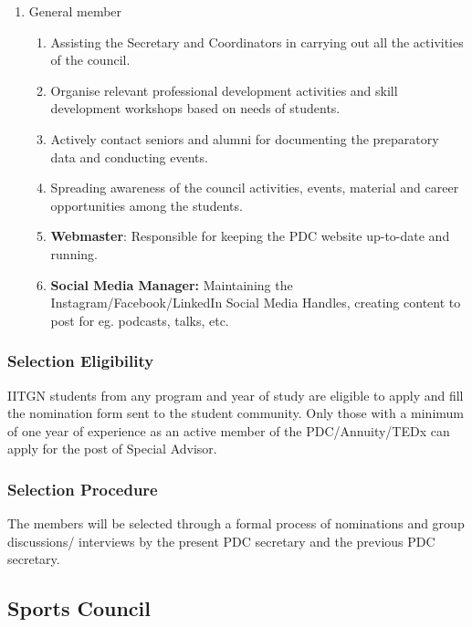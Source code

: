 \documentclass[12pt]{article}
\begin{document}
\begin{enumerate}
\begin{enumerate}
        \item Acting as a bridge between the PDC and the student body, the Special Advisor will communicate important information and gather feedback to ensure effective collaboration.
    \end{enumerate}
    \item General member
    \begin{enumerate}
        \item Assisting the Secretary and Coordinators in carrying out all the activities of the council.
        \item Organise relevant professional development activities and skill development workshops based on needs of students.
        \item Actively contact seniors and alumni for documenting the preparatory data and conducting events.
        \item Spreading awareness of the council activities, events, material and career opportunities among the students.
        \item \textbf{Webmaster}: Responsible for keeping the PDC  website up-to-date and running. 
        \item \textbf{Social Media Manager:} Maintaining the Instagram/Facebook/LinkedIn Social Media Handles, creating content to post for eg. podcasts, talks, etc.
    \end{enumerate}
\end{enumerate}

\subsubsection{Selection Eligibility}
IITGN students from any program and year of study are eligible to apply and fill the nomination form sent to the student community. Only those with a minimum of one year of experience as an active member of the PDC/Annuity/TEDx can apply for the post of Special Advisor.

\subsubsection{Selection Procedure}
The members will be selected through a formal process of nominations
and group discussions/ interviews by the present PDC secretary and the previous PDC secretary.


\newpage
\subsection{Sports Council}
\end{document}
